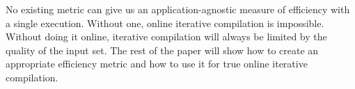 



    No existing metric can give us an application-agnostic measure of efficiency with a single execution. Without one, online iterative
    compilation is impossible. Without doing it online, iterative compilation will always be limited by the quality of the input set.
    The rest of the paper will show how to create an appropriate efficiency metric and how to use it for true online iterative
    compilation.

